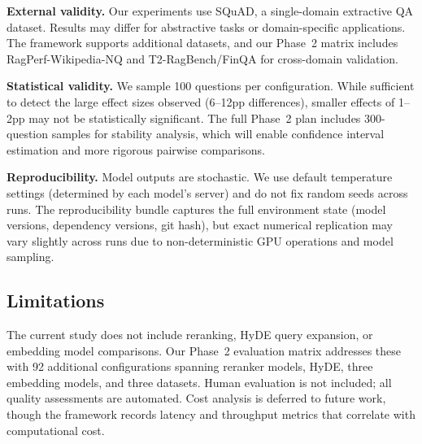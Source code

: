 \textbf{External validity.} Our experiments use SQuAD, a single-domain extractive QA dataset. Results may differ for abstractive tasks or domain-specific applications. The framework supports additional datasets, and our Phase~2 matrix includes RagPerf-Wikipedia-NQ and T2-RagBench/FinQA for cross-domain validation.

\textbf{Statistical validity.} We sample 100 questions per configuration. While sufficient to detect the large effect sizes observed (6--12pp differences), smaller effects of 1--2pp may not be statistically significant. The full Phase~2 plan includes 300-question samples for stability analysis, which will enable confidence interval estimation and more rigorous pairwise comparisons.

\textbf{Reproducibility.} Model outputs are stochastic. We use default temperature settings (determined by each model's server) and do not fix random seeds across runs. The reproducibility bundle captures the full environment state (model versions, dependency versions, git hash), but exact numerical replication may vary slightly across runs due to non-deterministic GPU operations and model sampling.

\subsection{Limitations}

The current study does not include reranking, HyDE query expansion, or embedding model comparisons. Our Phase~2 evaluation matrix addresses these with 92 additional configurations spanning reranker models, HyDE, three embedding models, and three datasets. Human evaluation is not included; all quality assessments are automated. Cost analysis is deferred to future work, though the framework records latency and throughput metrics that correlate with computational cost.
